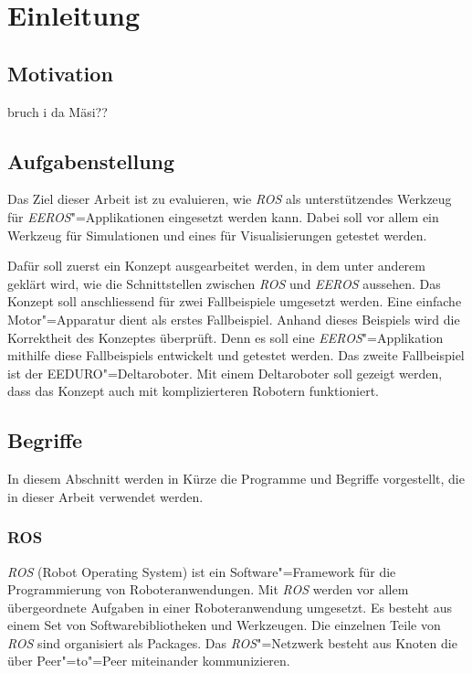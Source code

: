 \chapter{Einleitung}
\section{Motivation}
bruch i da Mäsi??




\section{Aufgabenstellung}
Das Ziel dieser Arbeit ist zu evaluieren, wie \textit{ROS} als unterstützendes Werkzeug für \textit{EEROS}"=Applikationen eingesetzt werden kann.
Dabei soll vor allem ein Werkzeug für Simulationen und eines für Visualisierungen getestet werden.

Dafür soll zuerst ein Konzept ausgearbeitet werden, in dem unter anderem geklärt wird, wie die Schnittstellen zwischen \textit{ROS} und \textit{EEROS} aussehen.
Das Konzept soll anschliessend für zwei Fallbeispiele umgesetzt werden.
Eine einfache Motor"=Apparatur dient als erstes Fallbeispiel.
Anhand dieses Beispiels wird die Korrektheit des Konzeptes überprüft.
Denn es soll eine \textit{EEROS}"=Applikation mithilfe diese Fallbeispiels entwickelt und getestet werden.
Das zweite Fallbeispiel ist der EEDURO"=Deltaroboter.
Mit einem Deltaroboter soll gezeigt werden, dass das Konzept auch mit komplizierteren Robotern funktioniert.

\section{Begriffe}
In diesem Abschnitt werden in Kürze die Programme und Begriffe vorgestellt, die in dieser Arbeit verwendet werden.

\subsection{ROS}
\textit{ROS} (Robot Operating System) ist ein Software"=Framework für die Programmierung von Roboteranwendungen.
Mit \textit{ROS} werden vor allem übergeordnete Aufgaben in einer Roboteranwendung umgesetzt.
Es besteht aus einem Set von Softwarebibliotheken und Werkzeugen.
Die einzelnen Teile von \textit{ROS} sind organisiert als Packages.
Das \textit{ROS}"=Netzwerk besteht aus Knoten die über Peer"=to"=Peer miteinander kommunizieren.

